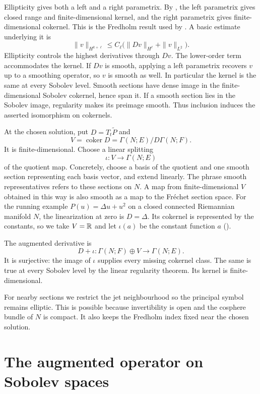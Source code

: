 Ellipticity gives both a left and a right parametrix. By
\citet[Theorems~19.5.1--19.5.2]{Hormander_Analysis_Linear_PDE_III},
the left parametrix gives closed range and finite-dimensional kernel,
and the right parametrix gives finite-dimensional cokernel. This is the
Fredholm result used by \citet[proof of Theorem~3.4.3, p.~68]{Steffens_Representability_Elliptic_Moduli}.
A basic estimate underlying it is
\[
 \|v\|_{H^{k+\ell}}
 \leq C_\ell\bigl(\|Dv\|_{H^\ell}+\|v\|_{L^2}\bigr).
\]
Ellipticity controls the highest derivatives through $Dv$.
The lower-order term accommodates the kernel.
If $Dv$ is smooth, applying a left parametrix recovers $v$ up to a
smoothing operator, so $v$ is smooth as well. In particular the kernel
is the same at every Sobolev level. Smooth sections have dense image
in the finite-dimensional Sobolev cokernel, hence span it. If a smooth
section lies in the Sobolev image, regularity makes its preimage smooth.
Thus inclusion induces the asserted isomorphism on cokernels.

At the chosen solution, put $D=T_t\widetilde P$ and
\[
 V=\operatorname{coker}D
   =\Gamma(N;E)/D\Gamma(N;F).
\]
It is finite-dimensional. Choose a linear splitting
\[
 \iota\colon V\longrightarrow\Gamma(N;E)
\]
of the quotient map.
Concretely, choose a basis of the quotient and one smooth section
representing each basis vector, and extend linearly.
The phrase smooth representatives refers to these sections on $N$.
A map from finite-dimensional $V$ obtained in this way is also smooth
as a map to the Fr\'echet section space.
For the running example $P(u)=\Delta u+u^2$ on a closed connected
Riemannian manifold $N$, the linearization at zero is $D=\Delta$.
Its cokernel is represented by the constants, so we take $V=\mathbb{R}$
and let $\iota(a)$ be the constant function $a$
().

The augmented derivative is
\[
 D+\iota\colon\Gamma(N;F)\oplus V\longrightarrow\Gamma(N;E).
\]
It is surjective: the image of $\iota$ supplies every missing cokernel
class. The same is true at every Sobolev level by the linear regularity
theorem. Its kernel is finite-dimensional.

For nearby sections we restrict the jet neighbourhood so the principal
symbol remains elliptic. This is possible because invertibility is open
and the cosphere bundle of $N$ is compact. It also keeps the Fredholm
index fixed near the chosen solution.

\section{The augmented operator on Sobolev spaces}

